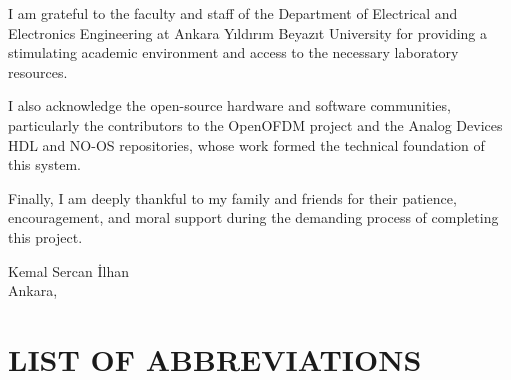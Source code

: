 \documentclass[12pt, a4paper, oneside]{report}
\begin{document}
I am grateful to the faculty and staff of the Department of Electrical and Electronics Engineering at Ankara Yıldırım Beyazıt University for providing a stimulating academic environment and access to the necessary laboratory resources.

I also acknowledge the open-source hardware and software communities, particularly the contributors to the OpenOFDM project and the Analog Devices HDL and NO-OS repositories, whose work formed the technical foundation of this system.

Finally, I am deeply thankful to my family and friends for their patience, encouragement, and moral support during the demanding process of completing this project.

\vspace{1cm}
\begin{flushright}
Kemal Sercan İlhan\\
Ankara, \the\year
\end{flushright}

\tableofcontents
{}

\listoffigures
{}

\listoftables
{}

\chapter*{LIST OF ABBREVIATIONS}
\thispagestyle{plain}
\end{document}

